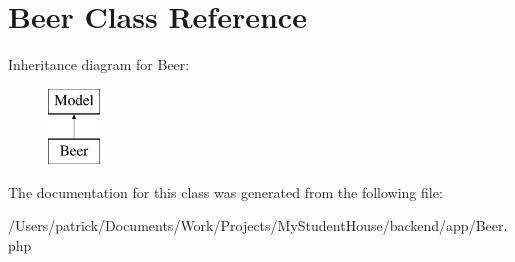 \hypertarget{class_app_1_1_beer}{}\section{Beer Class Reference}
\label{class_app_1_1_beer}
Inheritance diagram for Beer\+:\begin{figure}[H]
\begin{center}
\leavevmode
\includegraphics[height=2.000000cm]{class_app_1_1_beer}
\end{center}
\end{figure}


The documentation for this class was generated from the following file\+:\begin{DoxyCompactItemize}
\item 
/\+Users/patrick/\+Documents/\+Work/\+Projects/\+My\+Student\+House/backend/app/Beer.\+php\end{DoxyCompactItemize}
